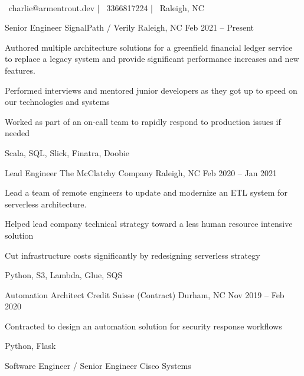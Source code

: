 \documentclass[]{awesome-cv}
\begin{document}
    
\begin{center}
	 \\
	\vspace{2mm}
	{\faEnvelope\ charlie@armentrout.dev} | {\faMobile\ 3366817224} | {\faMapMarker\ Raleigh, NC}
\end{center}
\begin{cventries}
	\cventry
	{Senior Engineer}
	{SignalPath / Verily}
	{Raleigh, NC}
	{Feb 2021 – Present}
	{\begin{cvitems}
		\item {Authored multiple architecture solutions for a greenfield financial ledger service to replace a legacy system and provide significant performance increases and new features.}
		\item {Performed interviews and mentored junior developers as they got up to speed on our technologies and systems}
		\item {Worked as part of an on-call team to rapidly respond to production issues if needed}
		\item {Scala, SQL, Slick, Finatra, Doobie}
		\end{cvitems}}
	\cventry
	{Lead Engineer}
	{The McClatchy Company}
	{Raleigh, NC}
	{Feb 2020 – Jan 2021}
	{\begin{cvitems}
		\item {Lead a team of remote engineers to update and modernize an ETL system for serverless architecture.}
		\item {Helped lead company technical strategy toward a less human resource intensive solution}
		\item {Cut infrastructure costs significantly by redesigning serverless strategy}
		\item {Python, S3, Lambda, Glue, SQS}
		\end{cvitems}}
	\cventry
	{Automation Architect}
	{Credit Suisse (Contract)}
	{Durham, NC}
	{Nov 2019 – Feb 2020}
	{\begin{cvitems}
		\item {Contracted to design an automation solution for security response workflows}
		\item {Python, Flask}
		\end{cvitems}}
	\cventry
	{Software Engineer / Senior Engineer}
	{Cisco Systems}

\end{cventries}
\end{document}
